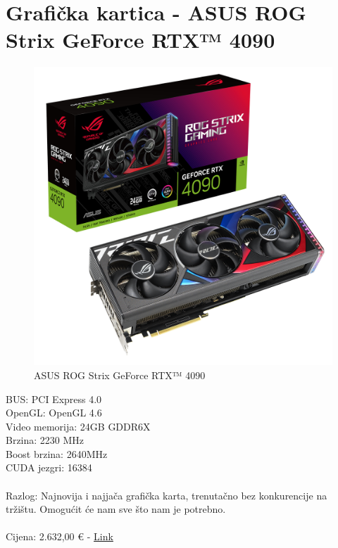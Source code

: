 \documentclass{report}
\begin{document}
\pagebreak

\section{Grafička kartica - ASUS ROG Strix GeForce RTX™ 4090}
\begin{figure}[H]
    \centering
    \includegraphics[scale=0.13]{Slike/rtx4090.png}
    \caption{ASUS ROG Strix GeForce RTX™ 4090}
    \label{fig:graficka}
\end{figure}
BUS: PCI Express 4.0\\OpenGL: OpenGL 4.6\\Video memorija: 24GB GDDR6X\\Brzina: 2230 MHz\\Boost brzina: 2640MHz\\CUDA jezgri: 16384\\\\Razlog: Najnovija i najjača grafička karta, trenutačno bez konkurencije na tržištu. Omogućit će nam sve što nam je potrebno.\\\\Cijena: 2.632,00 € - \href{https://team-media.hr/proizvod/asus-rog-strix-geforce-rtx-4090-oc-grafikkarte-24gb-gddr6x-2x-hdmi-3x-dp/?utm\_source=nabava.net\&utm\_campaign=nabava.net\&utm\_medium=click}{Link}
\end{document}
